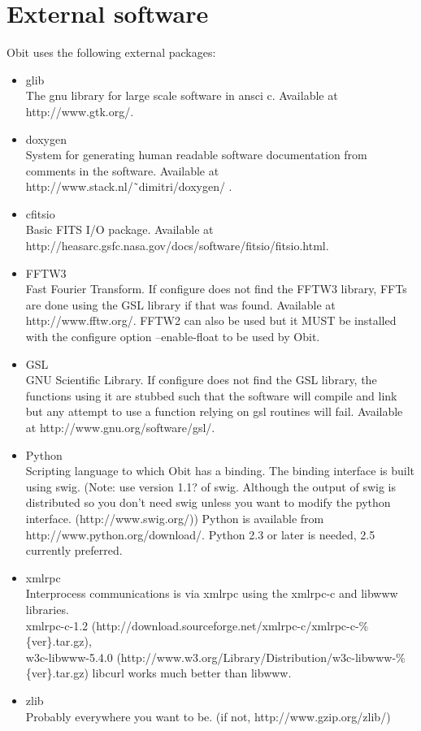 \documentclass[11pt]{article}
\begin{document}
\section{External software}
Obit uses the following external packages:
\begin{itemize}
\item  glib \\
The gnu library for large scale software in ansci c.
Available at http://www.gtk.org/.
\item  doxygen \\
System for generating human readable software documentation from
comments in the software.
Available at http://www.stack.nl/\~\ dimitri/doxygen/ .
\item  cfitsio \\
Basic FITS I/O package.
Available at http://heasarc.gsfc.nasa.gov/docs/software/fitsio/fitsio.html.
\item  FFTW3 \\
Fast Fourier Transform.
If configure does not find the FFTW3 library, FFTs are done using the GSL library
if that was found.
Available at http://www.fftw.org/.
FFTW2 can also be used but it MUST be installed with the configure
option --enable-float to be used by Obit.
\item  GSL \\
GNU Scientific Library.
If configure does not find the GSL library, the functions using it are stubbed
such that the software will compile and link but any attempt to use a function
relying on gsl routines will fail.
Available at http://www.gnu.org/software/gsl/.
\item  Python \\
Scripting language to which Obit has a binding.
The binding interface is built using swig.
(Note: use version 1.1? of swig. Although the output of swig is 
distributed  so you don't need swig unless you want to modify the
python interface. (http://www.swig.org/))
Python is available from http://www.python.org/download/.
Python 2.3 or later is needed, 2.5 currently preferred.
\item  xmlrpc \\
Interprocess communications is via xmlrpc using the xmlrpc-c and libwww 
libraries.\\
xmlrpc-c-1.2 (http://download.sourceforge.net/xmlrpc-c/xmlrpc-c-\%\{ver\}.tar.gz),\\
w3c-libwww-5.4.0 
(http://www.w3.org/Library/Distribution/w3c-libwww-\%\{ver\}.tar.gz)
libcurl works much better than libwww.
\item  zlib \\
Probably everywhere you want to be.
(if not, http://www.gzip.org/zlib/)
\end{itemize}
\end{document}
